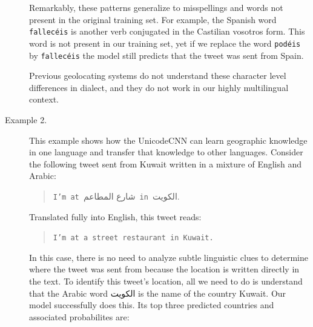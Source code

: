 \documentclass[sigconf,10pt]{acmart}
\newcommand{\str}[1]{\texttt{#1}}
\newcommand{\defn}[1]{\textit{#1}}
\newcommand{\uniloc}{\textsc{UniLoc}}
\begin{document}
\begin{description}
{\noindent
Remarkably, these patterns generalize to misspellings and words not present in the original training set.
For example, the Spanish word \str{fallec\'eis} is another verb conjugated in the Castilian vosotros form.
This word is not present in our training set,
yet if we replace the word \str{pod\'eis} by \str{fallec\'eis} the model still predicts that the tweet was sent from Spain.

\noindent

\noindent
Previous geolocating systems do not understand these character level differences in dialect,
and they do not work in our highly multilingual context.
}



\item[Example 2.]
    This example shows how the UnicodeCNN can learn geographic knowledge in one language and transfer that knowledge to other languages.
Consider the following tweet sent from Kuwait written in a mixture of English and Arabic:
\begin{quote}
\str{I'm at }\foreignlanguage{arabic}{شارع المطاعم}\str{ in }\foreignlanguage{arabic}{الكويت}.%
\end{quote}
Translated fully into English, this tweet reads:
\begin{quote}
    \str{I'm at a street restaurant in Kuwait.}
\end{quote}
In this case, there is no need to analyze subtle linguistic clues to determine where the tweet was sent from because the location is written directly in the text.
To identify this tweet's location, all we need to do is understand that the Arabic word 
\foreignlanguage{arabic}{الكويت}
is the name of the country Kuwait.
Our model successfully does this. 
Its top three predicted countries and associated probabilites are:


\end{description}
\end{document}
